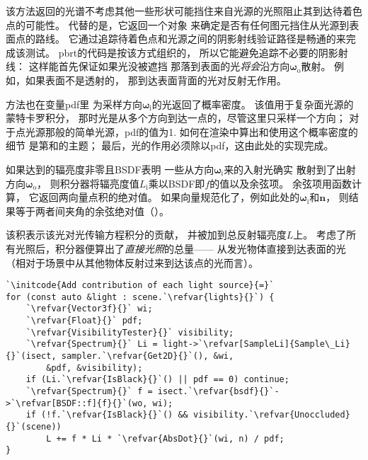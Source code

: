 该方法返回的光谱不考虑其他一些形状可能挡住来自光源的光照阻止其到达待着色点的可能性。
代替的是，它返回一个对象
来确定是否有任何图元挡住从光源到表面点的路线。
它通过追踪待着色点和光源之间的阴影射线验证路径是畅通的来完成该测试。
pbrt的代码是按该方式组织的，
所以它能避免追踪不必要的阴影射线：
这样能首先保证如果光没被遮挡
那落到表面的光\emph{将会}沿方向${\bm \omega}_\mathrm{o}$散射。
例如，如果表面不是透射的，
那到达表面背面的光对反射无作用。

方法也在变量{\ttfamily pdf}里
为采样方向${\bm \omega}_\mathrm{i}$的光返回了概率密度。
该值用于复杂面光源的蒙特卡罗积分，
那时光是从多个方向到达一点的，尽管这里只采样一个方向；
对于点光源那般的简单光源，{\ttfamily pdf}的值为1.
如何在渲染中算出和使用这个概率密度的细节
是第和的主题；
最后，光的作用必须除以{\ttfamily pdf}，这由此处的实现完成。

如果达到的辐亮度非零且BSDF表明
一些从方向${\bm \omega}_\mathrm{i}$来的入射光确实
散射到了出射方向${\bm \omega}_\mathrm{o}$，
则积分器将辐亮度值$L_\mathrm{i}$乘以BSDF即$f$的值以及余弦项。
余弦项用函数计算，
它返回两向量点积的绝对值。
如果向量规范化了，例如此处的${\bm \omega}_\mathrm{i}$和$\bm n$，
则结果等于两者间夹角的余弦绝对值（）。

该积表示该光对光传输方程积分的贡献，
并被加到总反射辐亮度$L$上。
考虑了所有光照后，积分器便算出了\emph{直接光照}的总量——
从发光物体直接到达表面的光
（相对于场景中从其他物体反射过来到达该点的光而言）。

\begin{lstlisting}
`\initcode{Add contribution of each light source}{=}`
for (const auto &light : scene.`\refvar{lights}{}`) {
    `\refvar{Vector3f}{}` wi;
    `\refvar{Float}{}` pdf;
    `\refvar{VisibilityTester}{}` visibility;
    `\refvar{Spectrum}{}` Li = light->`\refvar[SampleLi]{Sample\_Li}{}`(isect, sampler.`\refvar{Get2D}{}`(), &wi,
        &pdf, &visibility);
    if (Li.`\refvar{IsBlack}{}`() || pdf == 0) continue;
    `\refvar{Spectrum}{}` f = isect.`\refvar{bsdf}{}`->`\refvar[BSDF::f]{f}{}`(wo, wi);
    if (!f.`\refvar{IsBlack}{}`() && visibility.`\refvar{Unoccluded}{}`(scene))
        L += f * Li * `\refvar{AbsDot}{}`(wi, n) / pdf;
}
\end{lstlisting}

